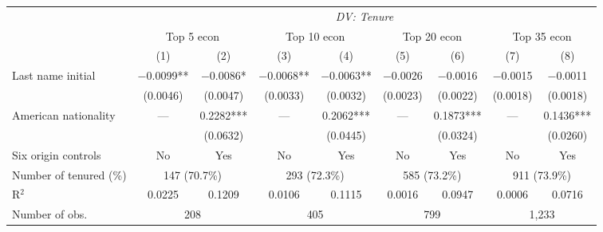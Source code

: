 \begin{tabular}{l *{8}{c}}
\toprule
& \multicolumn{8}{c}{\textit{DV: Tenure}} \\
 & \multicolumn{2}{c}{Top 5 econ} & \multicolumn{2}{c}{Top 10 econ} & \multicolumn{2}{c}{Top 20 econ} & \multicolumn{2}{c}{Top 35 econ} \\
\cmidrule(lr){2-3} \cmidrule(lr){4-5} \cmidrule(lr){6-7} \cmidrule(lr){8-9}
 & (1) & (2) & (3) & (4) & (5) & (6) & (7) & (8) \\
\midrule
Last name initial & $-$0.0099** & $-$0.0086* & $-$0.0068** & $-$0.0063** & $-$0.0026 & $-$0.0016 & $-$0.0015 & $-$0.0011 \\
 & (0.0046) & (0.0047) & (0.0033) & (0.0032) & (0.0023) & (0.0022) & (0.0018) & (0.0018) \\
American nationality & --- & 0.2282*** & --- & 0.2062*** & --- & 0.1873*** & --- & 0.1436*** \\
 &  & (0.0632) &  & (0.0445) &  & (0.0324) &  & (0.0260) \\
\midrule[0.25pt]
Six origin controls & No & Yes & No & Yes & No & Yes & No & Yes \\
Number of tenured (\%) & \multicolumn{2}{c}{147 (70.7\%)} & \multicolumn{2}{c}{293 (72.3\%)} & \multicolumn{2}{c}{585 (73.2\%)} & \multicolumn{2}{c}{911 (73.9\%)} \\
R$^2$ & 0.0225 & 0.1209 & 0.0106 & 0.1115 & 0.0016 & 0.0947 & 0.0006 & 0.0716 \\
Number of obs. & \multicolumn{2}{c}{208} & \multicolumn{2}{c}{405} & \multicolumn{2}{c}{799} & \multicolumn{2}{c}{1,233} \\
\bottomrule
\end{tabular}

